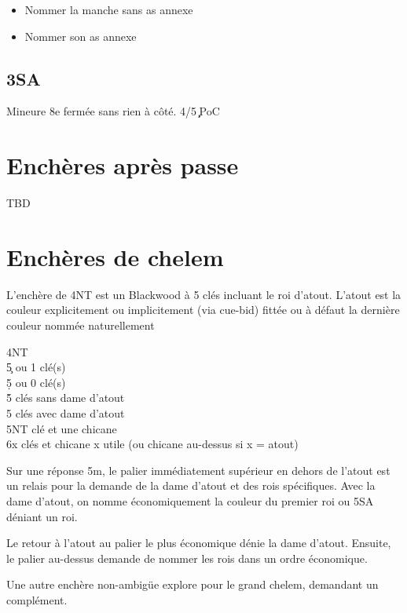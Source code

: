 \documentclass[a4paper]{article}
\begin{document}
\begin{itemize}
\item Nommer la manche sans as annexe

\item Nommer son as annexe

\end{itemize}

\subsection{3SA}

Mineure 8e fermée sans rien à côté. 
4/5\c \d\ PoC

\section{Enchères après passe}

TBD

\section{Enchères de chelem}

L'enchère de 4NT est un Blackwood à 5 clés incluant le roi d'atout. L'atout est la couleur explicitement ou implicitement (via cue-bid) fittée ou à défaut la dernière couleur nommée naturellement

\begin{bidtable}
4NT\+\\
5\c {} ou 1 clé(s)\\
5\d {} ou 0 clé(s)\\
5\h {} clés sans dame d'atout\\
5\s {} clés avec dame d'atout\\
5NT  clé et une chicane\\
6x  clés et chicane x utile (ou chicane au-dessus si x = atout)\-
\end{bidtable}

Sur une réponse 5m, le palier immédiatement supérieur en dehors de l'atout est un relais pour la demande de la dame d'atout et des rois spécifiques.
Avec la dame d'atout, on nomme économiquement la couleur du premier roi ou 5SA déniant un roi.

Le retour à l'atout au palier le plus économique dénie la dame d'atout. Ensuite, le palier au-dessus demande de nommer les rois dans un ordre économique.

Une autre enchère non-ambigüe explore pour le grand chelem, demandant un complément.
\end{document}
